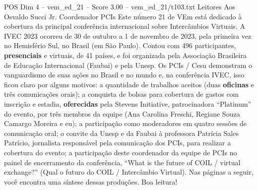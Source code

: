 \begin{textsample}{POS Dim 4 – vem\_ed\_21 – Score 3.00 – vem\_ed\_21/t103.txt}  \label{ex:f4_pos_098}
Leitores Aos Osvaldo Succi Jr.
Coordenador PCIs Este número 21 de VEm está dedicado à cobertura da principal conferência internacional sobre Intercâmbios Virtuais.
A IVEC 2023 ocorreu de 30 de outubro a 1 de novembro de 2023, pela primeira vez no Hemisfério Sul, no Brasil (em São Paulo).
Contou com 496 participantes, \textbf{presenciais} e virtuais, de 41 países, e foi organizada pela Associação Brasileira de Educação Internacional (Faubai) e pela Unesp.
Os PCIs / Cesu demonstram o vanguardismo de suas ações no Brasil e no mundo e, na conferência IVEC, isso ficou claro por alguns motivos: a quantidade de trabalhos aceitos (duas \textbf{oficinas} e três comunicações orais); a conquista de bolsas para cobertura de gastos com inscrição e estadia, \textbf{oferecidas} pela Stevens Initiative, patrocinadora “Platinum” do evento, por três membros da equipe (Ana Carolina Freschi, Regiane Souza Camargo Moreira e eu); a participação como moderadores em quatro sessões de comunicação oral; o convite da Unesp e da Faubai à professora Patrícia Sales Patrício, jornalista responsável pela comunicação dos PCIs, para realizar a cobertura do evento; a participação deste coordenador da equipe de PCIs no painel de encerramento da conferência, “What is the future of COIL / virtual exchange?” (Qual o futuro do COIL / Intercâmbio Virtual).
Nas páginas a seguir, você encontra uma síntese dessas produções.
Boa leitura!

\end{textsample}
